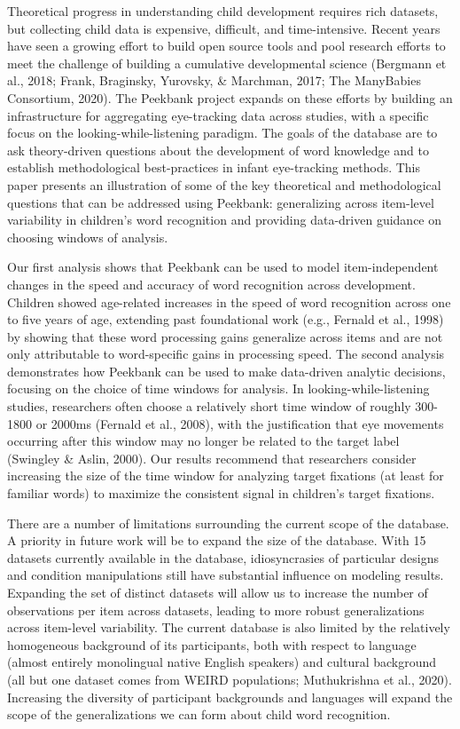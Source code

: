 \documentclass[10pt, letterpaper]{article}
\begin{document}
Theoretical progress in understanding child development requires rich
datasets, but collecting child data is expensive, difficult, and
time-intensive. Recent years have seen a growing effort to build open
source tools and pool research efforts to meet the challenge of building
a cumulative developmental science (Bergmann et al., 2018; Frank,
Braginsky, Yurovsky, \& Marchman, 2017; The ManyBabies Consortium,
2020). The Peekbank project expands on these efforts by building an
infrastructure for aggregating eye-tracking data across studies, with a
specific focus on the looking-while-listening paradigm. The goals of the
database are to ask theory-driven questions about the development of
word knowledge and to establish methodological best-practices in infant
eye-tracking methods. This paper presents an illustration of some of the
key theoretical and methodological questions that can be addressed using
Peekbank: generalizing across item-level variability in children's word
recognition and providing data-driven guidance on choosing windows of
analysis.

Our first analysis shows that Peekbank can be used to model
item-independent changes in the speed and accuracy of word recognition
across development. Children showed age-related increases in the speed
of word recognition across one to five years of age, extending past
foundational work (e.g., Fernald et al., 1998) by showing that these
word processing gains generalize across items and are not only
attributable to word-specific gains in processing speed. The second
analysis demonstrates how Peekbank can be used to make data-driven
analytic decisions, focusing on the choice of time windows for analysis.
In looking-while-listening studies, researchers often choose a
relatively short time window of roughly 300-1800 or 2000ms (Fernald et
al., 2008), with the justification that eye movements occurring after
this window may no longer be related to the target label (Swingley \&
Aslin, 2000). Our results recommend that researchers consider increasing
the size of the time window for analyzing target fixations (at least for
familiar words) to maximize the consistent signal in children's target
fixations.

There are a number of limitations surrounding the current scope of the
database. A priority in future work will be to expand the size of the
database. With 15 datasets currently available in the database,
idiosyncrasies of particular designs and condition manipulations still
have substantial influence on modeling results. Expanding the set of
distinct datasets will allow us to increase the number of observations
per item across datasets, leading to more robust generalizations across
item-level variability. The current database is also limited by the
relatively homogeneous background of its participants, both with respect
to language (almost entirely monolingual native English speakers) and
cultural background (all but one dataset comes from WEIRD populations;
Muthukrishna et al., 2020). Increasing the diversity of participant
backgrounds and languages will expand the scope of the generalizations
we can form about child word recognition.
\end{document}
